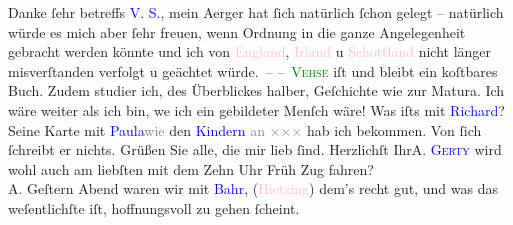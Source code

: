            Danke ſehr betreffs \textcolor{blue}{V. S.}{}\ledrightnote{\textcolor{blue}{Robert Gilbert Vansittart}}, mein Aerger hat ſich
               natürlich ſchon gelegt – natürlich würde es mich aber {\pb}ſehr freuen, wenn Ordnung in die ganze Angelegenheit gebracht werden könnte und ich
               von \textcolor{pink}{England}{}\ledrightnote{\textcolor{pink}{England}}, \textcolor{pink}{Irland}{}\ledrightnote{\textcolor{pink}{Irland}}
               u \textcolor{pink}{Schottland}{}\ledrightnote{\textcolor{pink}{Schottland}} nicht länger misverſtanden \introOben{}verfolgt u geächtet\introOben{} würde. –\pend
           \pstart
           – \textsc{\textcolor{green}{Vehse}{}} iſt und bleibt ein koſtbares Buch. Zudem studier ich, des Überblickes halber,
               Geſchichte \introOben{}wie\introOben{} zur Matura. Ich wäre weiter als ich bin, we{\geminationn} ich ein gebildeter Menſch wäre!\pend
           \pstart
           Was iſts mit \textcolor{blue}{Richard}{}\ledrightnote{\textcolor{blue}{Richard Beer-Hofmann}}? Seine Karte mit \textcolor{blue}{Paula}{}\ledrightnote{\textcolor{blue}{Paula Beer-Hofmann}}{ }\textcolor{gray}{wie} den \textcolor{gray}{\textcolor{blue}{Kindern}{}}{ }\textcolor{gray}{an}{ }\textcolor{gray}{×}\-\textcolor{gray}{×}\-\textcolor{gray}{×} hab ich bekommen. Von ſich
               ſchreibt er nichts. Grüßen Sie alle, die mir lieb ſind.\pend
           \pstart Herzlichſt Ihr\spacefill\mbox{A.{\pb}}\pend{}\pstart
           \noindent{}{\pb}\textsc{\textcolor{blue}{Gerty}{}\ledrightnote{\textcolor{blue}{Gertrude von Hofmannsthal}}} wird wohl auch am liebſten mit dem Zehn Uhr Früh Zug fahren?{\\}A.\pend
           \pstart
           Geſtern Abend waren wir mit \textcolor{blue}{Bahr}{}\ledrightnote{\textcolor{blue}{Hermann Bahr}}, (\textcolor{pink}{Hietzing}{}\ledrightnote{\textcolor{pink}{XIII., Hietzing}}) dem’s recht gut, und was das
                  weſentlichſte iſt, hoffnungsvoll zu gehen ſcheint.\pend
           \endnumbering{}  
      